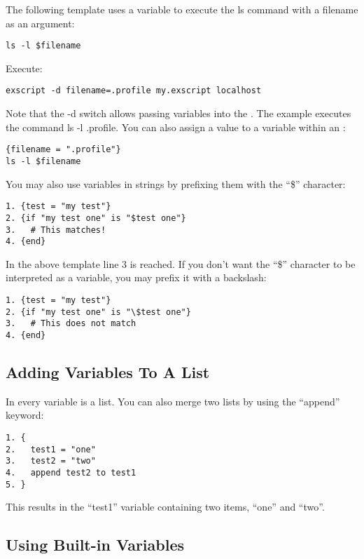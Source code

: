 The following template uses a variable to execute the ls command with a 
filename as an argument: 

\begin{lstlisting}
ls -l $filename
\end{lstlisting}

Execute:

\begin{lstlisting}
exscript -d filename=.profile my.exscript localhost 
\end{lstlisting}

Note that the -d switch allows passing variables into the \product. The 
example executes the command ls -l .profile. 
You can also assign a value to a variable within an \product: 

\begin{lstlisting}
{filename = ".profile"}
ls -l $filename
\end{lstlisting}

You may also use variables in strings by prefixing them with the ``\$'' 
character: 

\begin{lstlisting}
1. {test = "my test"}
2. {if "my test one" is "$test one"}
3.   # This matches!
4. {end}
\end{lstlisting}

In the above template line 3 is reached. If you don't want the ``\$'' 
character to be interpreted as a variable, you may prefix it with a 
backslash: 

\begin{lstlisting}
1. {test = "my test"}
2. {if "my test one" is "\$test one"}
3.   # This does not match
4. {end}
\end{lstlisting}

\subsection{Adding Variables To A List}

In \product every variable is a list. You can also merge two lists by 
using the ``append'' keyword: 

\begin{lstlisting}
1. {
2.   test1 = "one"
3.   test2 = "two"
4.   append test2 to test1
5. }
\end{lstlisting}

This results in the ``test1'' variable containing two items, ``one'' and 
``two''.

\subsection{Using Built-in Variables}

